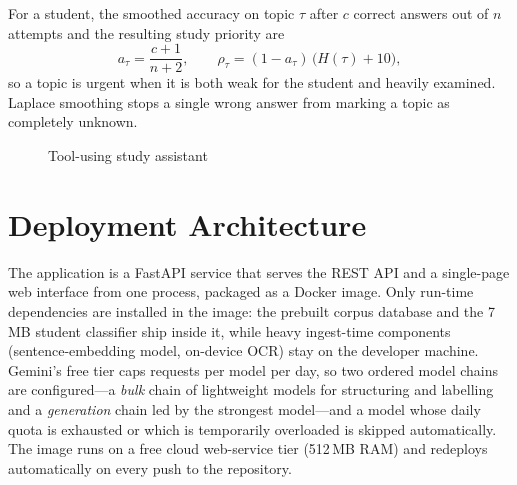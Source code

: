 For a student, the smoothed accuracy on topic $\tau$ after $c$ correct answers out of $n$ attempts and the resulting
study priority are
\begin{equation}
  a_\tau=\frac{c+1}{n+2}, \qquad \rho_\tau=(1-a_\tau)\,\bigl(H(\tau)+10\bigr),
  \label{eq:priority}
\end{equation}
so a topic is urgent when it is both weak for the student and heavily examined. Laplace smoothing stops a single wrong
answer from marking a topic as completely unknown.

\begin{figure}[t]
\centering
{}
\caption{Tool-using study assistant}
\label{fig:agent}
\end{figure}

\section{Deployment Architecture}
The application is a FastAPI service that serves the REST API and a single-page web interface from one process, packaged
as a Docker image. Only run-time dependencies are installed in the image: the prebuilt corpus database and the 7\,MB
student classifier ship inside it, while heavy ingest-time components (sentence-embedding model, on-device OCR) stay on
the developer machine. Gemini's free tier caps requests per model per day, so two ordered model chains are configured---a
\emph{bulk} chain of lightweight models for structuring and labelling and a \emph{generation} chain led by the strongest
model---and a model whose daily quota is exhausted or which is temporarily overloaded is skipped automatically. The image
runs on a free cloud web-service tier (512\,MB RAM) and redeploys automatically on every push to the repository.


